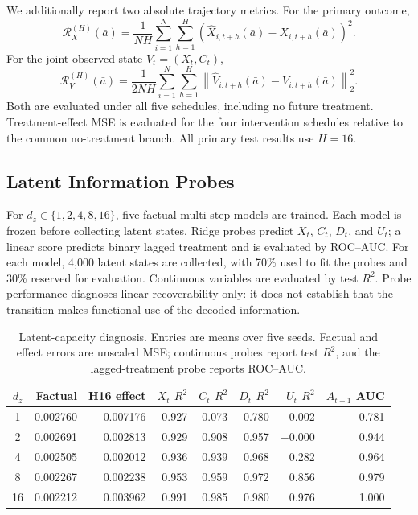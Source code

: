 We additionally report two absolute trajectory metrics. For the primary
outcome,
\begin{equation}
    \mathcal R_X^{(H)}(\bar a)
    =\frac{1}{NH}\sum_{i=1}^{N}\sum_{h=1}^{H}
    \left(\widehat X_{i,t+h}(\bar a)-X_{i,t+h}(\bar a)\right)^2.
\end{equation}
For the joint observed state $V_t=(X_t,C_t)$,
\begin{equation}
    \mathcal R_V^{(H)}(\bar a)
    =\frac{1}{2NH}\sum_{i=1}^{N}\sum_{h=1}^{H}
    \left\|\widehat V_{i,t+h}(\bar a)-V_{i,t+h}(\bar a)\right\|_2^2.
\end{equation}
Both are evaluated under all five schedules, including no future
treatment. Treatment-effect MSE is evaluated for the four intervention
schedules relative to the common no-treatment branch. All primary test
results use $H=16$.

\subsection{Latent Information Probes}
\label{app:latent-probes}

For $d_z\in\{1,2,4,8,16\}$, five factual multi-step models are trained.
Each model is frozen before collecting latent states. Ridge probes predict
$X_t$, $C_t$, $D_t$, and $U_t$; a linear score predicts binary lagged
treatment and is evaluated by ROC--AUC. For each model, 4,000 latent
states are collected, with 70\% used to fit the probes and 30\% reserved
for evaluation. Continuous variables are evaluated by test $R^2$. Probe
performance diagnoses linear recoverability only: it does not establish
that the transition makes functional use of the decoded information.

\begin{table}[t]
\centering
\small
\caption{Latent-capacity diagnosis. Entries are means over five seeds.
Factual and effect errors are unscaled MSE; continuous probes report
test $R^2$, and the lagged-treatment probe reports ROC--AUC.}
\label{tab:latent-probes}
\begin{tabular}{crrrrrrr}
\toprule
$d_z$ & Factual & H16 effect & $X_t$ $R^2$ & $C_t$ $R^2$
& $D_t$ $R^2$ & $U_t$ $R^2$ & $A_{t-1}$ AUC \\
\midrule
1  & 0.002760 & 0.007176 & 0.927 & 0.073 & 0.780 & 0.002 & 0.781 \\
2  & 0.002691 & 0.002813 & 0.929 & 0.908 & 0.957 & $-0.000$ & 0.944 \\
4  & 0.002505 & 0.002012 & 0.936 & 0.939 & 0.968 & 0.282 & 0.964 \\
8  & 0.002267 & 0.002238 & 0.953 & 0.959 & 0.972 & 0.856 & 0.979 \\
16 & 0.002212 & 0.003962 & 0.991 & 0.985 & 0.980 & 0.976 & 1.000 \\
\bottomrule
\end{tabular}
\end{table}

